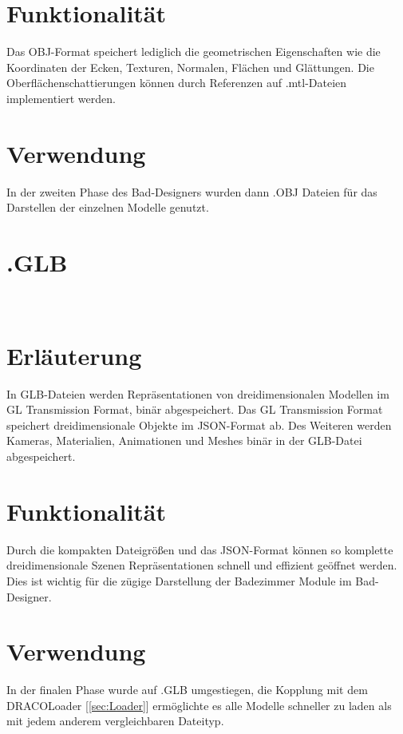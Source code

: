 \section*{Funktionalität}
Das OBJ-Format speichert lediglich die geometrischen Eigenschaften wie die Koordinaten der Ecken, Texturen, Normalen, Flächen und Glättungen. Die Oberflächenschattierungen können durch Referenzen auf .mtl-Dateien implementiert werden.

\section*{Verwendung}
In der zweiten Phase des Bad-Designers wurden dann .OBJ Dateien für das Darstellen der einzelnen Modelle genutzt. 
\clearpage
\newpage

\section{.GLB}\label{sec:GLB}
~\cite{GLB_01}
\section*{Erläuterung}
In GLB-Dateien werden Repräsentationen von dreidimensionalen Modellen im GL Transmission Format, binär abgespeichert. Das GL Transmission Format speichert dreidimensionale Objekte im JSON-Format ab. Des Weiteren werden Kameras, Materialien, Animationen und Meshes binär in der GLB-Datei abgespeichert. 
\section*{Funktionalität}
Durch die kompakten Dateigrößen und das JSON-Format können so komplette dreidimensionale Szenen Repräsentationen schnell und effizient geöffnet werden. Dies ist wichtig für die zügige Darstellung der Badezimmer Module im Bad-Designer.


\section*{Verwendung}
In der finalen Phase wurde auf .GLB umgestiegen, die Kopplung mit dem DRACOLoader [\ref{sec:Loader}] ermöglichte es alle Modelle schneller zu laden als mit jedem anderem vergleichbaren Dateityp.



